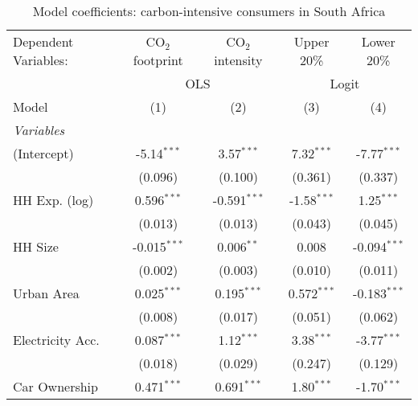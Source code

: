 
\begin{table}[htbp!]
   \centering
   \small
   \begin{adjustbox}{width = 1\textwidth, max height = 0.95\textheight, center}
      \begin{threeparttable}[b]
         \caption{\label{tab:Logit_1_ZAF} Model coefficients: carbon-intensive consumers in South Africa}
         \begin{tabular}{lcccc}
            \tabularnewline \midrule \midrule
            Dependent Variables: & CO$_{2}$ footprint & CO$_{2}$ intensity & Upper 20\%     & Lower 20\%\\   
             & \multicolumn{2}{c}{OLS} & \multicolumn{2}{c}{Logit} \\ 
            Model                & (1)                & (2)                & (3)            & (4)\\  
            \midrule
            \emph{Variables}\\
            (Intercept)          & -5.14$^{***}$      & 3.57$^{***}$       & 7.32$^{***}$   & -7.77$^{***}$\\   
                                 & (0.096)            & (0.100)            & (0.361)        & (0.337)\\   
            HH Exp. (log)        & 0.596$^{***}$      & -0.591$^{***}$     & -1.58$^{***}$  & 1.25$^{***}$\\   
                                 & (0.013)            & (0.013)            & (0.043)        & (0.045)\\   
            HH Size              & -0.015$^{***}$     & 0.006$^{**}$       & 0.008          & -0.094$^{***}$\\   
                                 & (0.002)            & (0.003)            & (0.010)        & (0.011)\\   
            Urban Area           & 0.025$^{***}$      & 0.195$^{***}$      & 0.572$^{***}$  & -0.183$^{***}$\\   
                                 & (0.008)            & (0.017)            & (0.051)        & (0.062)\\   
            Electricity Acc.     & 0.087$^{***}$      & 1.12$^{***}$       & 3.38$^{***}$   & -3.77$^{***}$\\   
                                 & (0.018)            & (0.029)            & (0.247)        & (0.129)\\   
            Car Ownership        & 0.471$^{***}$      & 0.691$^{***}$      & 1.80$^{***}$   & -1.70$^{***}$\\   

\end{tabular}
\end{threeparttable}
\end{adjustbox}
\end{table}
